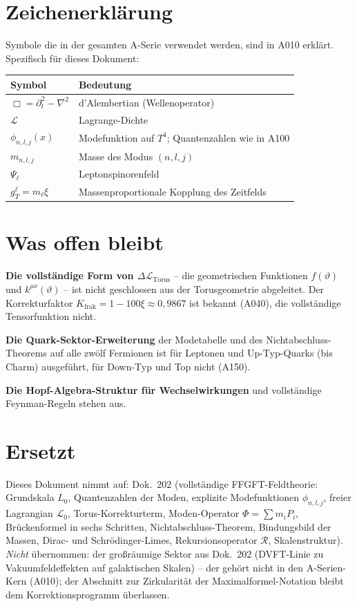 \section{Zeichenerklärung}

Symbole die in der gesamten A-Serie verwendet werden, sind in A010 erklärt.
Spezifisch für dieses Dokument:

\begin{center}
\renewcommand{\arraystretch}{1.3}
{\small\begin{tabular}{lp{9cm}}
\toprule
Symbol & Bedeutung \\
\midrule
$\Box = \partial_t^2 - \nabla^2$ & d'Alembertian (Wellenoperator) \\
$\mathcal{L}$ & Lagrange-Dichte \\
$\phi_{n,l,j}(x)$ & Modefunktion auf $T^4$; Quantenzahlen wie in A100 \\
$m_{n,l,j}$ & Masse des Modus $(n,l,j)$ \\
$\Psi_\ell$ & Leptonspinorenfeld \\
$g_T^\ell = m_\ell\xi$ & Massenproportionale Kopplung des Zeitfelds \\
\bottomrule
\end{tabular}}
\renewcommand{\arraystretch}{1.0}
\end{center}

\section{Was offen bleibt}

\textbf{Die vollständige Form von $\Delta\mathcal L_{\text{Torus}}$} -- die
geometrischen Funktionen $f(\vartheta)$ und $k^{\mu\nu}(\vartheta)$ -- ist nicht
geschlossen aus der Torusgeometrie abgeleitet. Der Korrekturfaktor $K_\text{frak}
=1-100\xi\approx0{,}9867$ ist bekannt (A040), die vollständige Tensorfunktion
nicht.

\textbf{Die Quark-Sektor-Erweiterung} der Modetabelle und des
Nichtabschluss-Theorems auf alle zwölf Fermionen ist für Leptonen und Up-Typ-Quarks
(bis Charm) ausgeführt, für Down-Typ und Top nicht (A150).

\textbf{Die Hopf-Algebra-Struktur für Wechselwirkungen} und vollständige
Feynman-Regeln stehen aus.

\section{Ersetzt}

Dieses Dokument nimmt auf: Dok.~202 (vollständige FFGFT-Feldtheorie: Grundskala
$L_0$, Quantenzahlen der Moden, explizite Modefunktionen $\phi_{n,l,j}$, freier
Lagrangian $\mathcal L_0$, Torus-Korrekturterm, Moden-Operator $\Phi=\sum m_i
P_i$, Brückenformel in sechs Schritten, Nichtabschluss-Theorem, Bindungsbild der
Massen, Dirac- und Schrödinger-Limes, Rekursionsoperator $\mathcal R$,
Skalenstruktur). \emph{Nicht} übernommen: der großräumige Sektor aus Dok.~202
(DVFT-Linie zu Vakuumfeldeffekten auf galaktischen Skalen) -- der gehört nicht in den A-Serien-Kern
(A010); der Abschnitt zur Zirkularität der Maximalformel-Notation bleibt dem
Korrektionsprogramm überlassen.

